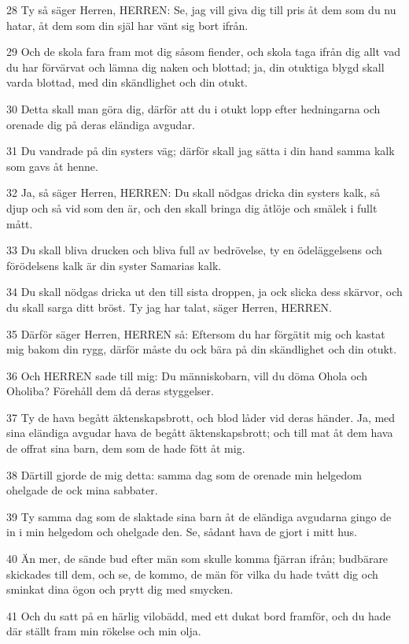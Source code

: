 \par 28 Ty så säger Herren, HERREN: Se, jag vill giva dig till pris åt dem som du nu hatar, åt dem som din själ har vänt sig bort ifrån.
\par 29 Och de skola fara fram mot dig såsom fiender, och skola taga ifrån dig allt vad du har förvärvat och lämna dig naken och blottad; ja, din otuktiga blygd skall varda blottad, med din skändlighet och din otukt.
\par 30 Detta skall man göra dig, därför att du i otukt lopp efter hedningarna och orenade dig på deras eländiga avgudar.
\par 31 Du vandrade på din systers väg; därför skall jag sätta i din hand samma kalk som gavs åt henne.
\par 32 Ja, så säger Herren, HERREN: Du skall nödgas dricka din systers kalk, så djup och så vid som den är, och den skall bringa dig åtlöje och smälek i fullt mått.
\par 33 Du skall bliva drucken och bliva full av bedrövelse, ty en ödeläggelsens och förödelsens kalk är din syster Samarias kalk.
\par 34 Du skall nödgas dricka ut den till sista droppen, ja ock slicka dess skärvor, och du skall sarga ditt bröst. Ty jag har talat, säger Herren, HERREN.
\par 35 Därför säger Herren, HERREN så: Eftersom du har förgätit mig och kastat mig bakom din rygg, därför måste du ock bära på din skändlighet och din otukt.
\par 36 Och HERREN sade till mig: Du människobarn, vill du döma Ohola och Oholiba? Förehåll dem då deras styggelser.
\par 37 Ty de hava begått äktenskapsbrott, och blod låder vid deras händer. Ja, med sina eländiga avgudar hava de begått äktenskapsbrott; och till mat åt dem hava de offrat sina barn, dem som de hade fött åt mig.
\par 38 Därtill gjorde de mig detta: samma dag som de orenade min helgedom ohelgade de ock mina sabbater.
\par 39 Ty samma dag som de slaktade sina barn åt de eländiga avgudarna gingo de in i min helgedom och ohelgade den. Se, sådant hava de gjort i mitt hus.
\par 40 Än mer, de sände bud efter män som skulle komma fjärran ifrån; budbärare skickades till dem, och se, de kommo, de män för vilka du hade tvått dig och sminkat dina ögon och prytt dig med smycken.
\par 41 Och du satt på en härlig vilobädd, med ett dukat bord framför, och du hade där ställt fram min rökelse och min olja.
